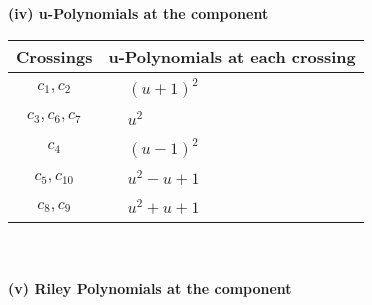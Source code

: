 \documentclass[1p]{elsarticle_modified}
\theoremstyle{definition}
\begin{document}
\newpage\renewcommand{\arraystretch}{1}
\flushleft \textbf{(iv) u-Polynomials at the component}\newline \\
\begin{tabular}{m{50pt}|m{274pt}}
Crossings & \hspace{64pt}u-Polynomials at each crossing \\
\hline $$\begin{aligned}c_{1},c_{2}\end{aligned}$$&$\begin{aligned}
&(u+1)^2
\end{aligned}$\\
\hline $$\begin{aligned}c_{3},c_{6},c_{7}\end{aligned}$$&$\begin{aligned}
&u^2
\end{aligned}$\\
\hline $$\begin{aligned}c_{4}\end{aligned}$$&$\begin{aligned}
&(u-1)^2
\end{aligned}$\\
\hline $$\begin{aligned}c_{5},c_{10}\end{aligned}$$&$\begin{aligned}
&u^2- u+1
\end{aligned}$\\
\hline $$\begin{aligned}c_{8},c_{9}\end{aligned}$$&$\begin{aligned}
&u^2+u+1
\end{aligned}$\\
\hline
\end{tabular}\\~\\
\newpage\renewcommand{\arraystretch}{1}
\flushleft \textbf{(v) Riley Polynomials at the component}\newline \\
\end{document}
